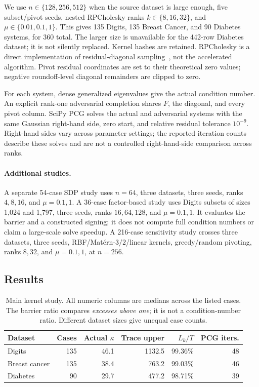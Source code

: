 \documentclass[final,leqno,letterpaper]{etna}
\begin{document}
We use $n\in\{128,256,512\}$ when the source dataset is large enough, five subset/pivot seeds, nested RPCholesky ranks $k\in\{8,16,32\}$, and $\mu\in\{0.01,0.1,1\}$. This gives 135 Digits, 135 Breast Cancer, and 90 Diabetes systems, for 360 total. The larger size is unavailable for the 442-row Diabetes dataset; it is not silently replaced. Kernel hashes are retained. RPCholesky is a direct implementation of residual-diagonal sampling~\cite{chen}, not the accelerated algorithm. Pivot residual coordinates are set to their theoretical zero values; negative roundoff-level diagonal remainders are clipped to zero.

For each system, dense generalized eigenvalues give the actual condition number. An explicit rank-one adversarial completion shares $F$, the diagonal, and every pivot column. SciPy PCG solves the actual and adversarial systems with the same Gaussian right-hand side, zero start, and relative residual tolerance $10^{-9}$. Right-hand sides vary across parameter settings; the reported iteration counts describe these solves and are not a controlled right-hand-side comparison across ranks.

\paragraph{Additional studies.}
A separate 54-case SDP study uses $n=64$, three datasets, three seeds, ranks $4,8,16$, and $\mu=0.1,1$. A 36-case factor-based study uses Digits subsets of sizes 1,024 and 1,797, three seeds, ranks $16,64,128$, and $\mu=0.1,1$. It evaluates the barrier and a constructed signing; it does not compute full condition numbers or claim a large-scale solve speedup. A 216-case sensitivity study crosses three datasets, three seeds, RBF/Mat\'ern-$3/2$/linear kernels, greedy/random pivoting, ranks $8,32$, and $\mu=0.1,1$, at $n=256$.

\subsection{Results}
\begin{table}[t]
\centering\small
\caption{Main kernel study. All numeric columns are medians across the listed cases. The barrier ratio compares \emph{excesses above one}; it is not a condition-number ratio. Different dataset sizes give unequal case counts.}\label{tab:main}
\begin{tabular}{lrrrrr}
\toprule
Dataset & Cases & Actual $\kappa$ & Trace upper & $L_k/T$ & PCG iters.\\\midrule
Digits & 135 & 46.1 & 1132.5 & 99.36\% & 48 \\
Breast cancer & 135 & 38.4 & 763.2 & 99.03\% & 46 \\
Diabetes & 90 & 29.7 & 477.2 & 98.71\% & 39 \\

\bottomrule
\end{tabular}
\end{table}
\end{document}
